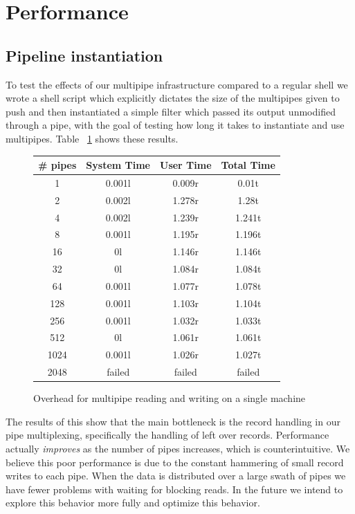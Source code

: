 \documentclass[10pt,conference,letterpaper]{IEEEtran}
\begin{document}
\section{Performance}

\subsection{Pipeline instantiation}

To test the effects of our multipipe infrastructure compared to a regular shell we wrote a shell script which explicitly dictates the size of the multipipes given to push and then instantiated a simple filter which passed its output unmodified through a pipe, with the goal of testing how long it takes to instantiate and use multipipes. Table ~\ref{fig:mpipeohead} shows these results.
\begin{figure}[htp]
\centering
\begin{center}

  \begin{tabular}{ | c | c | c || c |}
 \hline
 \# pipes & System Time & User Time & Total Time \\
 \hline
 1 & 0.001l & 0.009r & 0.01t \\
 2 & 0.002l & 1.278r & 1.28t \\ 
 4 & 0.002l & 1.239r & 1.241t \\
 8 & 0.001l & 1.195r & 1.196t \\
 16 & 0l & 1.146r & 1.146t \\
32 & 0l & 1.084r & 1.084t \\
64 & 0.001l & 1.077r & 1.078t \\
128 & 0.001l & 1.103r & 1.104t \\
 256 & 0.001l & 1.032r & 1.033t \\
 512 & 0l & 1.061r & 1.061t \\
 1024 & 0.001l & 1.026r & 1.027t \\
 2048 & failed & failed & failed \\
 \hline
 \end{tabular}
\end{center}
\caption{Overhead for multipipe reading and writing on a single machine}\label{fig:mpipeohead}
\end{figure}

The results of this show that the main bottleneck is the record handling in our pipe multiplexing, specifically the handling of left over records. Performance actually \emph{improves} as the number of pipes increases, which is counterintuitive. We believe this poor performance is due to the constant hammering of small record writes to each pipe. When the data is distributed over a large swath of pipes we have fewer problems with waiting for blocking reads. In the future we intend to explore this behavior more fully and optimize this behavior.
\end{document}
